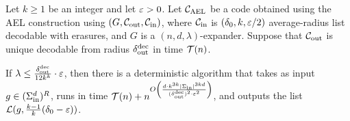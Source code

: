 \begin{theorem}\label{thm:sos_technical}
%
Let $k\geq 1$ be an integer and let $\varepsilon > 0$. Let ${ {\mathcal C}_{\mathrm{AEL}} }$ be a
code obtained using the AEL construction using  $(G, {\mathcal C}_{\mathrm{out}}, {\mathcal C}_{\mathrm{in}})$, where ${\mathcal C}_{\mathrm{in}}$ is $(\delta_0, k, \varepsilon/2)$ average-radius list decodable with erasures, and $G$ is a $(n,d,\lambda)$-expander. 
%
Suppose that ${\mathcal C}_{\mathrm{out}}$ is unique decodable from radius $\delta_{\mathrm{out}}^{\mathrm{dec}}$ in time ${\mathcal T}(n)$.

If $\lambda \leq \frac{\delta_{\mathrm{out}}^{\mathrm{dec}}}{12{k}^{k}} \cdot \varepsilon$, then there is a deterministic algorithm that takes as input $g\in (\Sigma_{\mathrm{in}}^d)^R$, runs in time ${\mathcal T}(n) + n^{O\left( \frac{d \cdot k^{3k}|\Sigma_{\mathrm{in}}|^{3kd}}{(\delta_{\mathrm{out}}^{\mathrm{dec}})^2\cdot \varepsilon^2}\right)}$, and outputs the list ${\mathcal L}(g,\frac{k-1}{k}(\delta_0-\varepsilon))$.
\end{theorem}

